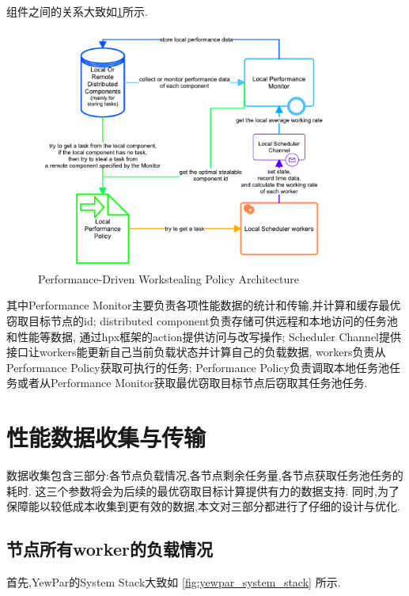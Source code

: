 \documentclass{mproj}
\begin{document}
组件之间的关系大致如\cref{fig:overall_architecture}所示.
\begin{figure}[h] %
    \centering %
    \includegraphics[width=0.9\textwidth]{images/overall_architecture.pdf} %
    \caption{Performance-Driven Workstealing Policy Architecture} %
    \label{fig:overall_architecture} %
\end{figure}
\FloatBarrier

其中Performance Monitor主要负责各项性能数据的统计和传输,并计算和缓存最优窃取目标节点的id;
distributed component负责存储可供远程和本地访问的任务池和性能等数据,
通过hpx框架的action提供访问与改写操作;
Scheduler Channel提供接口让workers能更新自己当前负载状态并计算自己的负载数据,
workers负责从Performance Policy获取可执行的任务;
Performance Policy负责调取本地任务池任务或者从Performance Monitor获取最优窃取目标节点后窃取其任务池任务.


\section{性能数据收集与传输}
数据收集包含三部分:各节点负载情况,各节点剩余任务量,各节点获取任务池任务的耗时.
这三个参数将会为后续的最优窃取目标计算提供有力的数据支持.
同时,为了保障能以较低成本收集到更有效的数据,本文对三部分都进行了仔细的设计与优化.

\subsection{节点所有worker的负载情况}
首先,YewPar的System Stack大致如
\cref{fig:yewpar_system_stack}
\cite{10.1007/978-3-030-29400-7_14}
所示.
\end{document}
